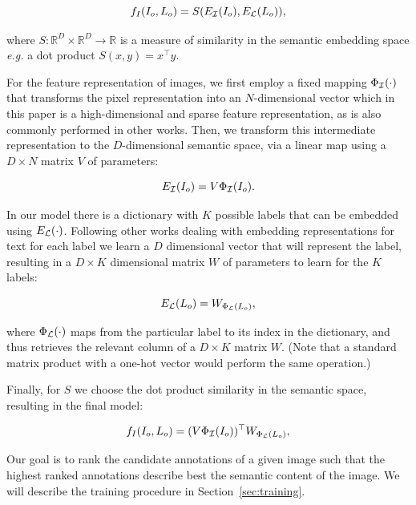 \[ f_I(I_o, L_o) = S( E_{\cal I}(I_o), E_{\cal L}(L_o)), \] 

where $S : {\mathbb R}^{D}\times {\mathbb R}^{D} \rightarrow
{\mathbb R}$ is a measure of similarity in the semantic embedding space {\it
e.g.} a dot product $S(x,y)=x^\top y$.

For the feature representation of images, we first employ a fixed 
mapping $\Phi_{\cal I}(\cdot)$ that transforms the pixel representation
 into an $N$-dimensional vector which in this paper is a high-dimensional 
and sparse feature representation, as is also 
commonly performed in other works. %
Then, we transform this intermediate representation to the $D$-dimensional semantic space, via
a linear map using a  $D \times N$ matrix $V$ of parameters:

\[ E_{\cal I}(I_o)  = V \Phi_{\cal I}(I_o).\]

In our model there is a dictionary with $K$ possible labels that can be embedded
using $E_{\cal L}(\cdot)$.  Following other works dealing with embedding
representations for text \cite{Bengio-scholarpedia-2007,wsabie} for each label
we learn a $D$ dimensional vector that will represent the label, resulting in a
$D \times K$ dimensional matrix $W$ of parameters to learn for the $K$ labels:

\[ E_{\cal L}(L_o) = W_{\Phi_{\cal L}(L_o)}, \]

where $\Phi_{\cal L}(\cdot)$ maps from the particular label to its index in the
dictionary, and thus retrieves the relevant column of a $D \times K$ matrix
$W$. (Note that a
standard matrix product with a one-hot vector would perform the same operation.)

Finally, for $S$ we choose the dot product similarity in the semantic space, resulting in the final model:

\[ f_I(I_o, L_o) = (V \Phi_{\cal I}(I_o))^\top W_{\Phi_{\cal L}(L_o)},\]
  
Our goal is to rank the candidate annotations of a given image such
that the highest ranked annotations describe best the semantic content of
the image.  We will describe the training procedure in
Section~\ref{sec:training}.  

